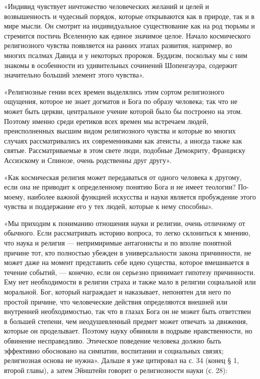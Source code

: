 «Индивид чувствует ничтожество человеческих желаний и целей и возвышенность и
чудесный порядок, которые открываются как в природе, так и в мире мысли. Он
смотрит на индивидуальное существование как на род тюрьмы и стремится постичь
Вселенную как единое значимое целое. Начало космического религиозного чувства
появляется на ранних этапах развития, например, во многих псалмах Давида и у
некоторых пророков. Буддизм, поскольку мы с ним знакомы в особенности из
удивительных сочинений Шопенгауэра, содержит значительно больший элемент этого
чувства».

«Религиозные гении всех времен выделялись этим сортом религиозного ощущения,
которое не знает догматов и Бога по образу человека; так что не может быть
церкви, центральное учение которой было бы построено на этом. Поэтому именно
среди еретиков всех времен мы встречаем людей, преисполненных высшим видом
религиозного чувства и которые во многих случаях рассматривались их
современниками как атеисты, а иногда также как святые. Рассматриваемые в этом
свете люди, подобные Демокриту, Франциску Ассизскому и Спинозе, очень
родственны друг другу».

«Как космическая религия может передаваться от одного человека к другому, если
она не приводит к определенному понятию Бога и не имеет теологии? По-моему,
наиболее важной функцией искусства и науки является пробуждение этого чувства и
поддержание его у тех людей, которые к нему способны».

«Мы приходим к пониманию отношения науки и религии, очень отличному от
обычного. Если рассматривать историю вопроса, то легко склониться к мнению, что
наука и религия --- непримиримые антагонисты и по вполне понятной причине тот,
кто полностью убежден в универсальности закона причинности, не может даже на
момент представить себе идею существа, которое вмешивается в течение событий, ---
конечно, если он серьезно принимает гипотезу причинности. Ему нет необходимости
в религии страха и также мало в религии социальной или моральной. Бог, который
награждает и наказывает, непонятен для него по простой причине, что
человеческие действия определяются внешней или внутренней необходимостью, так
что в глазах Бога он не может быть ответствен в большей степени, чем
неодушевленный предмет может отвечать за движения, которые он проделывает.
Поэтому науку обвиняли в подрыве нравственности, но обвинение несправедливо.
Этическое поведение человека должно быть эффективно обосновано на симпатии,
воспитании и социальных связях; религиозная основа не
нужна». Дальше я уже цитировал на с. 34 (конец § 1, второй главы), а затем
Эйнштейн говорит о религиозности науки (с. 28):

